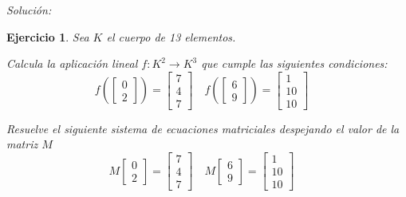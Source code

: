 \documentclass[12pt]{amsart}
\newtheorem{ejer}{Ejercicio}
\begin{document}
{\it Soluci\'on:}



\begin{ejer} Sea $K$ el cuerpo de 13 elementos.
\newline
\noindent\begin{minipage}{\textwidth}
\begin{tcolorbox}[colback = green!20!white,title=Versión Aplicación]
Calcula la aplicaci\'on lineal $f:K^{2} \to K^{3}$ que cumple las siguientes condiciones: 
\[f\left(\left[\begin{array}{r}
0 \\
2
\end{array}\right]\right) = \left[\begin{array}{r}
7 \\
4 \\
7
\end{array}\right] \quad f\left(\left[\begin{array}{r}
6 \\
9
\end{array}\right]\right) = \left[\begin{array}{r}
1 \\
10 \\
10
\end{array}\right] \quad 
\]\end{tcolorbox}
\end{minipage} \newline
\noindent\begin{minipage}{\textwidth}
\begin{tcolorbox}[colback = blue!20!white,title=Versión Sistema Matricial]
Resuelve el siguiente sistema de ecuaciones matriciales despejando el valor de la matriz $M$
\[M \left[\begin{array}{r}
0 \\
2
\end{array}\right] = \left[\begin{array}{r}
7 \\
4 \\
7
\end{array}\right] \quad M \left[\begin{array}{r}
6 \\
9
\end{array}\right] = \left[\begin{array}{r}
1 \\
10 \\
10
\end{array}\right] \quad 
\]
\end{tcolorbox}
\end{minipage}
\end{ejer}
\end{document}
